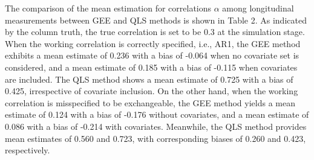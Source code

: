 \documentclass[
]{aft}
\begin{document}
The comparison of the mean estimation for correlations \(\alpha\) among
longitudinal measurements between GEE and QLS methods is shown in Table
2. As indicated by the column truth, the true correlation is set to be
0.3 at the simulation stage. When the working correlation is correctly
specified, i.e., AR1, the GEE method exhibits a mean estimate of 0.236
with a bias of -0.064 when no covariate set is considered, and a mean
estimate of 0.185 with a bias of -0.115 when covariates are included.
The QLS method shows a mean estimate of 0.725 with a bias of 0.425,
irrespective of covariate inclusion. On the other hand, when the working
correlation is misspecified to be exchangeable, the GEE method yields a
mean estimate of 0.124 with a bias of -0.176 without covariates, and a
mean estimate of 0.086 with a bias of -0.214 with covariates. Meanwhile,
the QLS method provides mean estimates of 0.560 and 0.723, with
corresponding biases of 0.260 and 0.423, respectively.

\begin{table}[H]
\centering\centering
\caption{\footnotesize Comparison of mean estimation for the correlation among longitudinal measurements using GEE and QLS methods, with and without adjustment for age, sex, and BSA.}
\centering
{}
\end{table}
\end{document}
